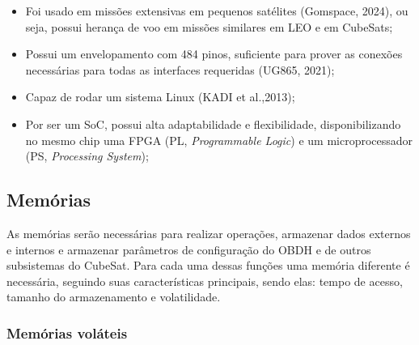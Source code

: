 \begin{itemize}
	\item Foi usado em missões extensivas em pequenos satélites (Gomspace, 2024), ou seja, possui herança de voo em missões similares em LEO e em CubeSats;
	\item Possui um envelopamento com 484 pinos, suficiente para prover as conexões necessárias para todas as interfaces requeridas (UG865, 2021);
	\item Capaz de rodar um sistema Linux (KADI et al.,2013);
	\item Por ser um SoC, possui alta adaptabilidade e flexibilidade, disponibilizando no mesmo chip uma FPGA (PL, \textit{Programmable Logic}) e um microprocessador (PS, \textit{Processing System});
\end{itemize}

\subsection{Memórias}

As memórias serão necessárias para realizar operações, armazenar dados externos e internos e armazenar parâmetros de configuração do OBDH e de outros subsistemas do CubeSat. Para cada uma dessas funções uma memória diferente é necessária, seguindo suas características principais, sendo elas: tempo de acesso, tamanho do armazenamento e volatilidade.

\subsubsection{Memórias voláteis}




